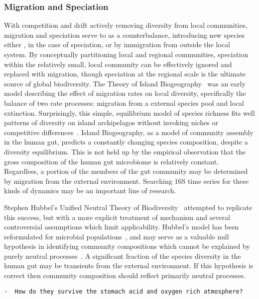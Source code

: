 \documentclass[12pt]{article}
\begin{document}
\subsubsection{Migration and Speciation}
With competition and drift actively removing diversity from local
communities, migration and speciation serve to as a counterbalance,
introducing new species either ,
in the case of speciation, or by immigration from outside the
local system.
By conceptually partitioning local and regional communities,
speciation within the relatively small, local community can be effectively
ignored and replaced with migration,
though speciation at the regional scale is the ultimate source of global
biodiversity.
The Theory of Island Biogeography~\citep{macarthur1967b} was
an early model describing the effect of migration rates on local diversity,
specifically the balance of two rate processes:
migration from a external species pool and local extinction.
Surprisingly, this simple, equilibrium model of species richness
fits well patterns of diversity on island archipelagos
without invoking niches or competitive differences~\citep{TODO}.
Island Biogeography, as a model of community assembly in the human gut,
predicts a constantly changing species composition,
despite a diversity equilibrium.
This is not held up by the empirical observation that the gross composition of
the human gut microbiome is relatively constant.
Regardless, a portion of the members of the gut community may be determined
by migration from the external environment.
Searching 16S time series for these kinds of dynamics may be an important
line of research.

Stephen Hubbel's Unified Neutral Theory of Biodiversity~\citeyearpar{TODO} attempted to
replicate this success, but with a more explicit treatment of mechanism
and several controversial assumptions which limit applicability.
Hubbel's model has been reformulated for microbial populations~\citep{Sloan2005},
and may serve as a valuable null hypothesis in identifying community
compositions which cannot be explained by purely neutral processes~\cite{VenkataramenTODO}.
A significant fraction of the species diversity in the human gut may be
transients from the external environment.
If this hypothesis is correct then community composition should reflect
primarily neutral processes.

\begin{verbatim}
-  How do they survive the stomach acid and oxygen rich atmosphere?
\end{verbatim}
\end{document}
